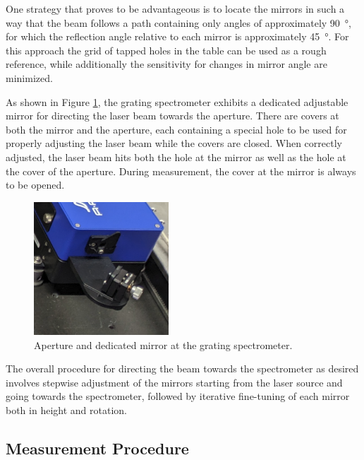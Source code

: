 One strategy that proves to be advantageous is to locate the mirrors in such a way that the beam follows a path containing only angles of approximately \SI{90}{\degree}, for which the reflection angle relative to each mirror is approximately \SI{45}{\degree}. For this approach the grid of tapped holes in the table can be used as a rough reference, while additionally the sensitivity for changes in mirror angle are minimized.

As shown in Figure \ref{fig:execution:aperture}, the grating spectrometer exhibits a dedicated adjustable mirror for directing the laser beam towards the aperture. There are covers at both the mirror and the aperture, each containing a special hole to be used for properly adjusting the laser beam while the covers are closed. When correctly adjusted, the laser beam hits both the hole at the mirror as well as the hole at the cover of the aperture. During measurement, the cover at the mirror is always to be opened.

\begin{figure}[H]
    \centering
    \includegraphics[width=0.45\textwidth]{graphics/aperture.png}
    \caption{Aperture and dedicated mirror at the grating spectrometer.}
    \label{fig:execution:aperture}
\end{figure}


The overall procedure for directing the beam towards the spectrometer as desired involves stepwise adjustment of the mirrors starting from the laser source and going towards the spectrometer, followed by iterative fine-tuning of each mirror both in height and rotation.

\subsection{Measurement Procedure}




